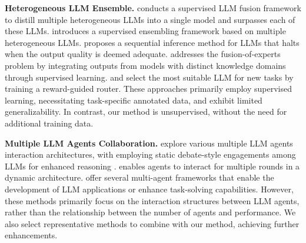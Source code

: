  
\textbf{Heterogeneous LLM Ensemble. } \citet{fusellm} conducts a supervised LLM fusion framework to distill multiple heterogeneous LLMs into a single model and surpasses each of these LLMs. \citet{llm-blender} introduces a supervised ensembling framework based on multiple heterogeneous LLMs. \citet{frugalgpt} proposes a sequential inference method for LLMs that halts when the output quality is deemed adequate. \citet{foe} addresses the fusion-of-experts problem by integrating outputs from models with distinct knowledge domains through supervised learning. \citet{llms-routing} and \citet{rtte} select the most suitable LLM for new tasks by training a reward-guided router. These approaches primarily employ supervised learning, necessitating task-specific annotated data, and exhibit limited generalizability. In contrast, our method is unsupervised, without the need for additional training data.


\textbf{Multiple LLM Agents Collaboration. } \cite{debate,mad,debate3} explore various multiple LLM agents interaction architectures, with employing static debate-style engagements among LLMs for enhanced reasoning . \citet{dylan} enables agents to interact for multiple rounds in a dynamic architecture. \citet{camel,metagpt,autogen,agentverse,autoagent} offer several multi-agent frameworks that enable the development of LLM applications or enhance task-solving capabilities. However, these methods primarily focus on the interaction structures between LLM agents, rather than the relationship between the number of agents and performance. We also select representative methods \cite{debate,reflexion} to combine with our method, achieving further enhancements.


